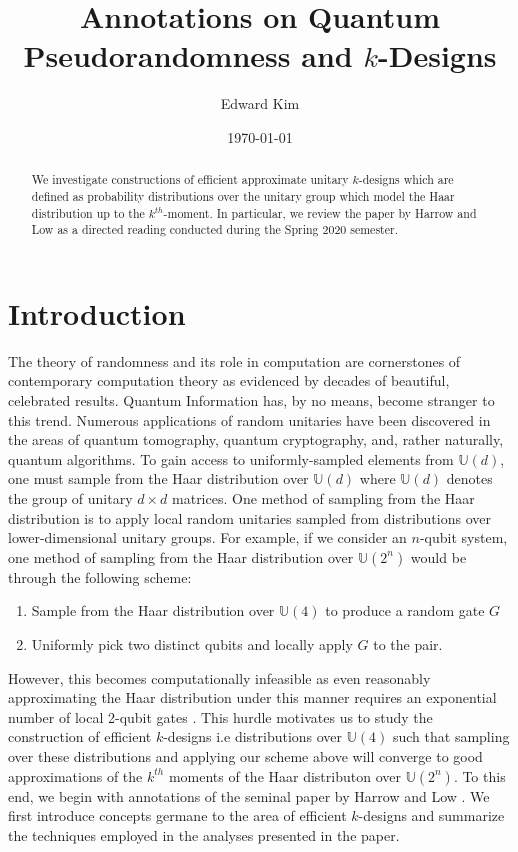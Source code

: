 \documentclass[12pt]{amsart}
\theoremstyle{definition}
\theoremstyle{remark}
\numberwithin{equation}{section}
\theoremstyle{remark}
\begin{document}
\title{Annotations on Quantum Pseudorandomness and $k$-Designs}
\author{Edward Kim}
\date{\today}
\maketitle

\begin{abstract}
  We investigate constructions of efficient approximate unitary $k$-designs which are defined as probability distributions over the unitary group which model the Haar distribution up to the $k^{th}$-moment. In particular, we review the paper by Harrow and Low as a directed reading conducted during the Spring 2020 semester.
\end{abstract}

\tableofcontents

\section{Introduction}

The theory of randomness and its role in computation are cornerstones of contemporary computation theory as evidenced by decades of beautiful, celebrated results. Quantum Information has, by no means, become stranger to this trend. Numerous applications of random unitaries have been discovered in the areas of quantum tomography, quantum cryptography, and, rather naturally, quantum algorithms. To gain access to uniformly-sampled elements from $\mathbb{U}(d)$, one must sample from the Haar distribution over $\mathbb{U}(d)$ where $\mathbb{U}(d)$ denotes the group of unitary $d \times d$ matrices. One method of sampling from the Haar distribution is to apply local random unitaries sampled from distributions over lower-dimensional unitary groups. For example, if we consider an $n$-qubit system, one method of sampling from the Haar distribution over $\mathbb{U}(2^n)$ would be through the following scheme:
\begin{enumerate}
  \item Sample from the Haar distribution over $\mathbb{U}(4)$ to produce a random gate $G$
  \item Uniformly pick two distinct qubits and locally apply $G$ to the pair.
\end{enumerate}
However, this becomes computationally infeasible as even reasonably approximating the Haar distribution under this manner requires an exponential number of local 2-qubit gates \cite{knill}. This hurdle motivates us to study the construction of efficient $k$-designs i.e distributions over $\mathbb{U}(4)$ such that sampling over these distributions and applying our scheme above will converge to good approximations of the $k^{th}$ moments of the Haar distributon over $\mathbb{U}(2^n)$. To this end, we begin with annotations of the seminal paper by Harrow and Low \cite{harrlow}. We first introduce concepts germane to the area of efficient $k$-designs and summarize the techniques employed in the analyses presented in the paper.
\end{document}
